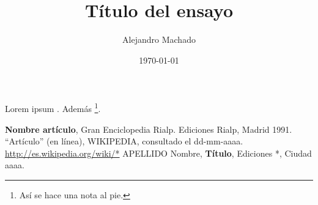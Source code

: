 \documentclass[letterpaper,12pt]{article}
\begin{document}
\title{Título del ensayo}
\author{\normalsize{Alejandro Machado}}
\date{\normalsize{\today}}
\maketitle

\thispagestyle{empty}
\pagestyle{empty}

Lorem ipsum \cite{rialp}. Además \footnote{Así se hace una nota al pie.}.

\Blindtext

\begin{thebibliography}{}
        \textbf{Nombre artículo}, Gran Enciclopedia Rialp. Ediciones Rialp,
        Madrid 1991.
        ``Artículo'' (en línea), WIKIPEDIA, consultado el dd-mm-aaaa. \\
        \url{http://es.wikipedia.org/wiki/*}
        APELLIDO Nombre, \textbf{Título}, Ediciones *, Ciudad aaaa.
\end{thebibliography}
\end{document}
